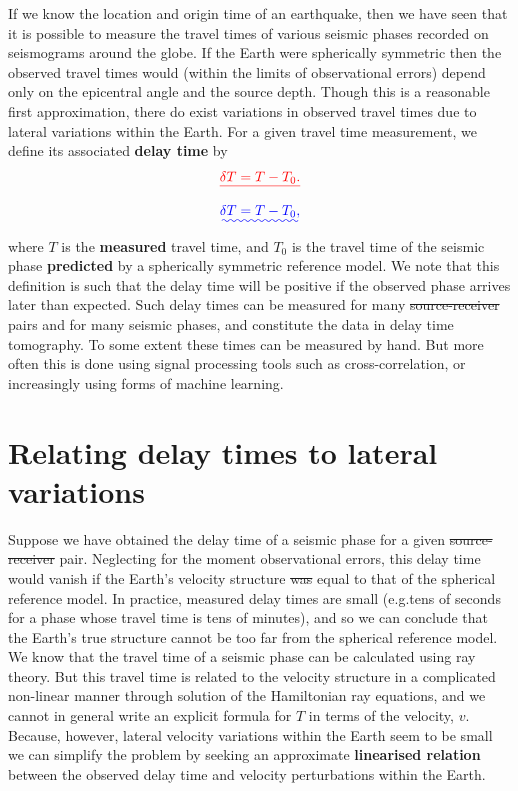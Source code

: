 \documentclass[a4paper,12pt]{paper}
\providecommand{\DIFadd}[1]{{\protect\color{blue}\uwave{#1}}} %
\providecommand{\DIFdel}[1]{{\protect\color{red}\sout{#1}}}                      %
\providecommand{\DIFaddbegin}{} %
\providecommand{\DIFaddend}{} %
\providecommand{\DIFdelbegin}{} %
\providecommand{\DIFdelend}{} %
\begin{document}
If we know the location and origin time of an earthquake, then we have seen that it is possible to measure the travel times of 
various seismic phases recorded on seismograms around the globe. If the Earth were spherically symmetric then the observed travel 
times would (within the limits of observational errors) depend only on the epicentral angle and the source depth. Though this is 
a reasonable first approximation, there do exist variations in observed travel times due to lateral variations within the Earth. 
For a given travel time measurement, we define its associated \textbf{delay time} by
\DIFdelbegin \begin{displaymath}
    \DIFdel{\delta T = T - T_{0}.
}\end{displaymath}%
\DIFdelend \DIFaddbegin \begin{equation}
    \DIFadd{\delta T = T - T_{0},
    \label{eq:1}
}\end{equation}\DIFaddend 
where $T$ is the \textbf{measured} travel time, and $T_{0}$ is the travel time of the seismic phase \textbf{predicted}
by a spherically symmetric reference model. We note that this definition is such that the delay time will be positive if the observed 
phase arrives later than expected. Such delay times can be measured for many \DIFdelbegin \DIFdel{source-receiver }\DIFdelend \DIFaddbegin \DIFadd{source--receiver }\DIFaddend pairs and for many seismic 
phases, and constitute the data in delay time tomography. To some extent these times can be measured by hand. But more 
often this is done using signal processing tools such as cross-correlation, or increasingly using forms of machine 
learning.

\section*{Relating delay times to lateral variations}

Suppose we have obtained the delay time of a seismic phase for a given \DIFdelbegin \DIFdel{source-receiver }\DIFdelend \DIFaddbegin \DIFadd{source--receiver }\DIFaddend pair. Neglecting for the moment 
observational errors, this delay time would vanish if the Earth's velocity structure \DIFdelbegin \DIFdel{was }\DIFdelend \DIFaddbegin \DIFadd{were }\DIFaddend equal to that of the spherical 
reference model. In practice, measured delay times are small (e.g.\DIFaddbegin \DIFadd{\ }\DIFaddend tens of seconds for a phase whose travel time is tens 
of minutes), and so we can conclude that the Earth's true structure cannot be too far from the spherical reference model. 
We know that the travel time of a seismic phase can be calculated using ray theory. But this travel time is related to 
the velocity structure in a complicated non-linear manner through solution of the Hamiltonian ray equations, and we 
cannot in general write an explicit formula for $T$ in terms of the velocity, $v$. Because, however, lateral velocity 
variations within the Earth seem to be small we can simplify the problem by seeking an approximate \textbf{linearised relation}
between the observed delay time and velocity perturbations within the Earth. 
\end{document}
